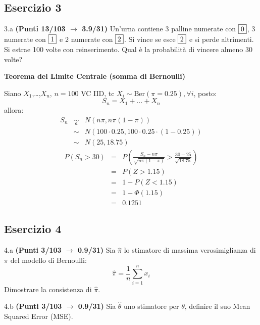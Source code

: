 \documentclass[
  11pt,
]{book}
\theoremstyle{mytheoremstyle}
\theoremstyle{mydefstyle}
\newenvironment{sol}
  {
  \begin{tcolorbox}[enhanced,breakable,arc=0.1mm,boxrule=1pt,colback=white,colframe=iblue,
  title=\bf \fontfamily{lmss}\selectfont \hspace{.5 cm} Soluzione,drop fuzzy shadow]

}{
\end{tcolorbox}
  }
\begin{document}
\subsection{Esercizio 3}\label{esercizio-3-48}

3.a \textbf{(Punti 13/103 \(\rightarrow\) 3.9/31)} Un'urna contiene 3 palline numerate con \(\fbox{0}\), 3 numerate con \(\fbox{1}\) e 2 numerate con \(\fbox{2}\). Si vince se esce \(\fbox{2}\) e si perde altrimenti. Si estrae 100 volte con reinserimento. Qual è la probabilità di vincere almeno 30 volte?

\begin{sol}
\textbf{Teorema del Limite Centrale (somma di Bernoulli)}

Siano \(X_1\),\ldots,\(X_n\), \(n=100\) VC IID, tc \(X_i\sim\text{Ber}(\pi=0.25)\)\(,\forall i\), posto:
\[
      S_n = X_1 + ... + X_n
      \]
allora:\begin{eqnarray*}
  S_n & \mathop{\sim}\limits_{a}& N(n\pi,n\pi(1-\pi)) \\
      &\sim & N(100\cdot0.25,100\cdot0.25\cdot(1-0.25)) \\
      &\sim & N(25,18.75)
  \end{eqnarray*}\begin{eqnarray*}
      P( S_n   >   30 ) 
        &=& P\left(  \frac { S_n  -  n\pi }{ \sqrt{n\pi(1-\pi)} }  >  \frac { 30  -  25 }{\sqrt{ 18.75 }} \right)  \\
                 &=& P\left(  Z   >   1.15 \right) \\    &=& 1-P(Z< 1.15 )\\ 
                 &=&  1-\Phi( 1.15 ) \\ &=&  0.1251 
      \end{eqnarray*}

\end{sol}

\subsection{Esercizio 4}\label{esercizio-4-48}

4.a \textbf{(Punti 3/103 \(\rightarrow\) 0.9/31)} Sia \(\hat \pi\) lo stimatore di massima verosimiglianza di \(\pi\) del modello di Bernoulli:
\[\hat\pi =  \frac 1n\sum_{i=1}^n x_i\]
Dimostrare la consistenza di \(\hat \pi\).

4.b \textbf{(Punti 3/103 \(\rightarrow\) 0.9/31)} Sia \(\hat\theta\) uno stimatore per \(\theta\), definire il suo Mean Squared Error (MSE).
\end{document}
